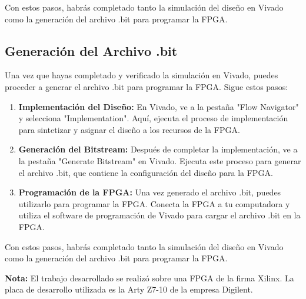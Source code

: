 \documentclass[12pt,a4paper, twoside]{article} %
\begin{document}
Con estos pasos, habrás completado tanto la simulación del diseño en Vivado como la generación del archivo .bit para programar la FPGA.



\subsection{Generación del Archivo .bit}

Una vez que hayas completado y verificado la simulación en Vivado, puedes proceder a generar el archivo .bit para programar la FPGA. Sigue estos pasos:

\begin{enumerate}
    \item \textbf{Implementación del Diseño:} En Vivado, ve a la pestaña "Flow Navigator" y selecciona "Implementation". Aquí, ejecuta el proceso de implementación para sintetizar y asignar el diseño a los recursos de la FPGA.
    
    \item \textbf{Generación del Bitstream:} Después de completar la implementación, ve a la pestaña "Generate Bitstream" en Vivado. Ejecuta este proceso para generar el archivo .bit, que contiene la configuración del diseño para la FPGA.
    
    \item \textbf{Programación de la FPGA:} Una vez generado el archivo .bit, puedes utilizarlo para programar la FPGA. Conecta la FPGA a tu computadora y utiliza el software de programación de Vivado para cargar el archivo .bit en la FPGA.
\end{enumerate}

Con estos pasos, habrás completado tanto la simulación del diseño en Vivado como la generación del archivo .bit para programar la FPGA.

\textbf{Nota:} El trabajo desarrollado se realizó sobre una FPGA de la firma Xilinx. La placa de desarrollo utilizada es la Arty Z7-10 de la empresa Digilent.
\end{document}
